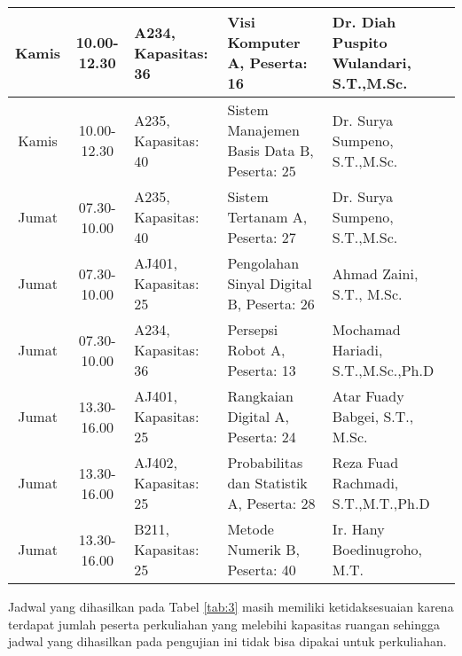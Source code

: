 \begin{longtable}[c]{|c|c|>{\centering\arraybackslash}m{2.5cm}|>{\centering\arraybackslash}m{4cm}|>{\centering\arraybackslash}m{3.2cm}|}
    Kamis  & 10.00-12.30 & A234, Kapasitas: 36    & Visi Komputer A, \linebreak Peserta: 16                             & Dr. Diah Puspito Wulandari, S.T.,M.Sc.        \\ \hline
    Kamis  & 10.00-12.30 & A235, Kapasitas: 40    & Sistem Manajemen Basis Data B, \linebreak Peserta: 25               & Dr. Surya Sumpeno, S.T.,M.Sc.                 \\ \hline
    Jumat  & 07.30-10.00 & A235, Kapasitas: 40    & Sistem Tertanam A, \linebreak Peserta: 27                           & Dr. Surya Sumpeno, S.T.,M.Sc.                 \\ \hline
    Jumat  & 07.30-10.00 & AJ401, Kapasitas: 25   & Pengolahan Sinyal Digital B, \linebreak Peserta: 26                 & Ahmad Zaini, S.T., M.Sc.                      \\ \hline
    Jumat  & 07.30-10.00 & A234, Kapasitas: 36    & Persepsi Robot A, \linebreak Peserta: 13                            & Mochamad Hariadi, S.T.,M.Sc.,Ph.D             \\ \hline
    Jumat  & 13.30-16.00 & AJ401, Kapasitas: 25   & Rangkaian Digital A, \linebreak Peserta: 24                         & Atar Fuady Babgei, S.T., M.Sc.                \\ \hline
    Jumat  & 13.30-16.00 & AJ402, Kapasitas: 25   & Probabilitas dan Statistik A, \linebreak Peserta: 28                & Reza Fuad Rachmadi, S.T.,M.T.,Ph.D            \\ \hline
    Jumat  & 13.30-16.00 & B211, Kapasitas: 25    & Metode Numerik B, \linebreak Peserta: 40                            & Ir. Hany Boedinugroho, M.T.                   \\ \hline
  \end{longtable}
Jadwal yang dihasilkan pada Tabel \ref{tab:3} masih memiliki ketidaksesuaian karena terdapat jumlah peserta perkuliahan yang melebihi kapasitas ruangan sehingga jadwal yang dihasilkan pada pengujian ini tidak bisa dipakai untuk perkuliahan.
